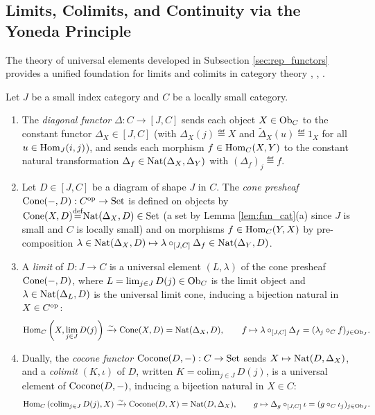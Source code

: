 \documentclass[10pt,a4paper]{article}
\begin{document}
\subsection{Limits, Colimits, and Continuity via the Yoneda Principle}\label{sec:limits_colimits}
The theory of universal elements developed in Subsection \ref{sec:rep_functors} provides a unified foundation for limits and colimits in category theory \cite[Ch.~III, Sec.~3--4]{MacLane1998}, \cite[Ch.~3]{Riehl2016}, \cite[Vol.~1, Ch.~2]{Borceux1994}.

\begin{definition}\label{def:limits}
Let $J$ be a small index category and $C$ be a locally small category.
\begin{enumerate}
\item The \emph{diagonal functor} $\Delta : C \to [J, C]$ sends each object $X \in {\textrm{Ob}}_C$ to the constant functor $\Delta_X \in [J, C]$ (with $\Delta_X(j) \eqdef X$ and $\widetilde{\Delta}_X(u) \eqdef 1_X$ for all $u \in {\textrm{Hom}}_J(i, j)$), and sends each morphism $f \in {\textrm{Hom}}_C(X, Y)$ to the constant natural transformation $\Delta_f \in {\textrm{Nat}}(\Delta_X, \Delta_Y)$ with $(\Delta_f)_j \eqdef f$.
\item Let $D \in [J, C]$ be a diagram of shape $J$ in $C$. The \emph{cone presheaf} ${\mathrm{Cone}}(-, D) : C^{\textrm{op}} \to {\textrm{Set}}$ is defined on objects by ${\mathrm{Cone}}(X, D) {\stackrel{{\textrm{def}}}{=}} {\textrm{Nat}}(\Delta_X, D) \in {\textrm{Set}}$ (a set by Lemma \ref{lem:fun_cat}(a) since $J$ is small and $C$ is locally small) and on morphisms $f \in {\textrm{Hom}}_C(Y, X)$ by pre-composition $\lambda \in {\textrm{Nat}}(\Delta_X, D) \mapsto \lambda \circ_{[J,C]} \Delta_f \in {\textrm{Nat}}(\Delta_Y, D)$.
\item A \emph{limit} of $D : J \to C$ is a universal element $(L, \lambda)$ of the cone presheaf ${\mathrm{Cone}}(-, D)$, where $L = \lim_{j \in J} D(j) \in {\textrm{Ob}}_C$ is the limit object and $\lambda \in {\textrm{Nat}}(\Delta_L, D)$ is the universal limit cone, inducing a bijection natural in $X \in C^{\textrm{op}}$:
$${\textrm{Hom}}_C\left(X, \lim_{j \in J} D(j)\right) \xrightarrow{\sim} {\mathrm{Cone}}(X, D) = {\textrm{Nat}}(\Delta_X, D), \qquad f \mapsto \lambda \circ_{[J,C]} \Delta_f = (\lambda_j \circ_C f)_{j \in {\textrm{Ob}}_J}.$$
\item Dually, the \emph{cocone functor} ${\mathrm{Cocone}}(D, -) : C \to {\textrm{Set}}$ sends $X \mapsto {\textrm{Nat}}(D, \Delta_X)$, and a \emph{colimit} $(K, \iota)$ of $D$, written $K = \mathrm{colim}_{j \in J}\, D(j)$, is a universal element of ${\mathrm{Cocone}}(D, -)$, inducing a bijection natural in $X \in C$:
$${\textrm{Hom}}_C\left(\mathrm{colim}_{j \in J}\, D(j), X\right) \xrightarrow{\sim} {\mathrm{Cocone}}(D, X) = {\textrm{Nat}}(D, \Delta_X), \qquad g \mapsto \Delta_g \circ_{[J,C]} \iota = (g \circ_C \iota_j)_{j \in {\textrm{Ob}}_J}.$$
\end{enumerate}
\end{definition}
\end{document}
